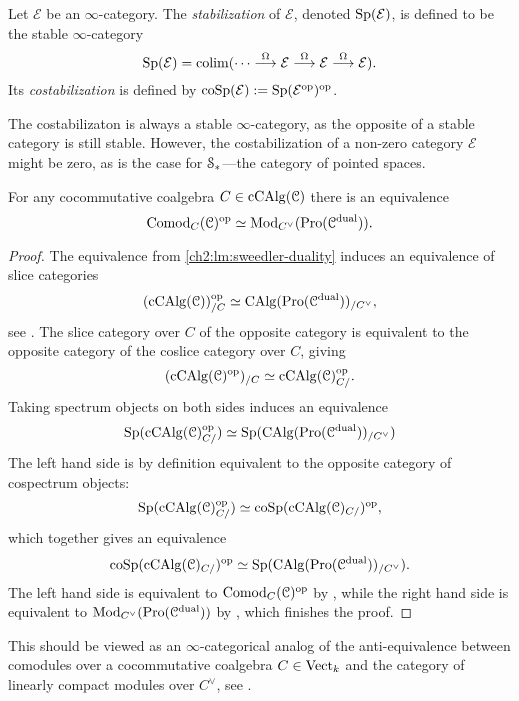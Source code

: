 \begin{definition}
    Let $\mathcal{E}$ be an $\infty$-category. The \emph{stabilization} of $\mathcal{E}$, denoted $\mathrm{Sp}(\mathcal{E})$, is defined to be the stable $\infty$-category 
    \[\mathrm{Sp}(\mathcal{E}) = \operatorname{colim} (\cdots\overset{\Omega}{\longrightarrow}\mathcal{E}\overset{\Omega}{\longrightarrow}\mathcal{E}\overset{\Omega}{\longrightarrow}\mathcal{E}).\] 
    Its \emph{costabilization} is defined by $\mathrm{coSp}(\mathcal{E}):= \mathrm{Sp}(\mathcal{E}^{\mathrm{op}})^{\mathrm{op}}$. 
\end{definition}

The costabilizaton is always a stable $\infty$-category, as the opposite of a stable category is still stable. However, the costabilization of a non-zero category $\mathcal{E}$ might be zero, as is the case for $\EuScript{S}_*$---the category of pointed spaces. 

\begin{proposition}
    \label{ch2:prop:comodules-and-promodules}
    For any cocommutative coalgebra $C\in \operatorname{cCAlg}(\EuScript{C})$ there is an equivalence 
    \[\mathrm{Comod}_C(\EuScript{C})^{\mathrm{op}}\simeq \mathrm{Mod}_{C^\vee}(\operatorname{Pro}(\EuScript{C}^{\mathrm{dual}})).\]  
\end{proposition}
\begin{proof}
    The equivalence from \cref{ch2:lm:sweedler-duality} induces an equivalence of slice categories 
    \[(\operatorname{cCAlg}(\EuScript{C}))_{/C}^{\mathrm{op}} \simeq \operatorname{CAlg}(\operatorname{Pro}(\EuScript{C}^{\mathrm{dual}}))_{/C^\vee},\]
    see \cite[5.2.5.1]{lurie_09}. The slice category over $C$ of the opposite category is equivalent to the opposite category of the coslice category over $C$, giving 
    \[(\operatorname{cCAlg}(\EuScript{C})^{\mathrm{op}})_{/C} \simeq \operatorname{cCAlg}(\EuScript{C})^{\mathrm{op}}_{C/}.\]
    Taking spectrum objects on both sides induces an equivalence
    \[\mathrm{Sp}(\operatorname{cCAlg}(\EuScript{C})_{C/}^{\mathrm{op}})\simeq \mathrm{Sp}(\operatorname{CAlg}(\operatorname{Pro}(\EuScript{C}^{\mathrm{dual}}))_{/C^\vee})\]
    The left hand side is by definition equivalent to the opposite category of cospectrum objects:
    \[\mathrm{Sp}(\operatorname{cCAlg}(\EuScript{C})_{C/}^{\mathrm{op}})\simeq \mathrm{coSp}(\operatorname{cCAlg}(\EuScript{C})_{C/})^{\mathrm{op}},\]
    which together gives an equivalence
    \[\mathrm{coSp}(\operatorname{cCAlg}(\EuScript{C})_{C/})^{\mathrm{op}} \simeq \mathrm{Sp}(\operatorname{CAlg}(\operatorname{Pro}(\EuScript{C}^{\mathrm{dual}}))_{/C^\vee}).\]
    The left hand side is equivalent to $\mathrm{Comod}_C(\EuScript{C})^{\mathrm{op}}$ by \cite[1.0.3]{chen_2024}, while the right hand side is equivalent to $\mathrm{Mod}_{C^\vee}(\operatorname{Pro}(\EuScript{C}^{\mathrm{dual}}))$ by \cite[7.3.4.13]{Lurie_HA}, which finishes the proof.  
\end{proof}

\begin{remark}
    This should be viewed as an $\infty$-categorical analog of the anti-equivalence between comodules over a cocommutative coalgebra $C\in \mathrm{Vect}_k$ and the category of linearly compact modules over $C^\vee$, see \cite[II.29]{lefschetz_1942}. 
\end{remark}

